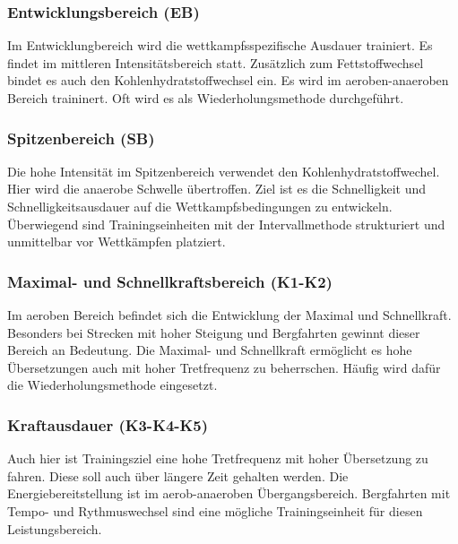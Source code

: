 \subsubsection{Entwicklungsbereich (EB)}
Im Entwicklungbereich wird die wettkampfsspezifische Ausdauer trainiert. Es findet im mittleren Intensitätsbereich statt. Zusätzlich zum Fettstoffwechsel bindet es auch den Kohlenhydratstoffwechsel ein. Es wird im aeroben-anaeroben Bereich traininert. Oft wird es als Wiederholungsmethode durchgeführt.
\subsubsection{Spitzenbereich (SB)}
Die hohe Intensität im Spitzenbereich verwendet den Kohlenhydratstoffwechel. Hier wird die anaerobe Schwelle übertroffen. Ziel ist es die Schnelligkeit und Schnelligkeitsausdauer auf die Wettkampfsbedingungen zu entwickeln. Überwiegend sind Trainingseinheiten mit der Intervallmethode strukturiert und unmittelbar vor Wettkämpfen platziert.
\subsubsection{Maximal- und Schnellkraftsbereich (K1-K2)}
Im aeroben Bereich befindet sich die Entwicklung der Maximal und Schnellkraft. Besonders bei Strecken mit hoher Steigung und Bergfahrten gewinnt dieser Bereich an Bedeutung. Die Maximal- und Schnellkraft ermöglicht es hohe Übersetzungen auch mit hoher Tretfrequenz zu beherrschen. Häufig wird dafür die Wiederholungsmethode eingesetzt.
\subsubsection{Kraftausdauer (K3-K4-K5)}
Auch hier ist Trainingsziel eine hohe Tretfrequenz mit hoher Übersetzung zu fahren. Diese soll auch über längere Zeit gehalten werden. Die Energiebereitstellung ist im aerob-anaeroben Übergangsbereich. Bergfahrten mit Tempo- und Rythmuswechsel sind eine mögliche Trainingseinheit für diesen Leistungsbereich.
